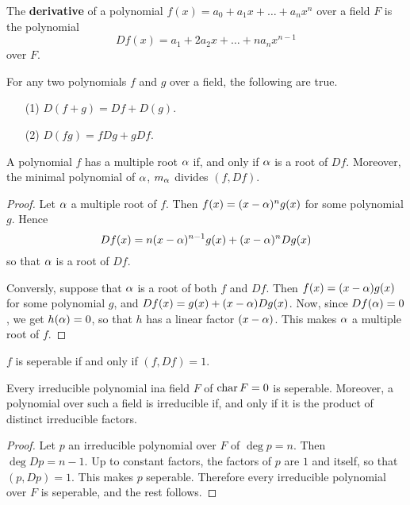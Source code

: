 \begin{definition}
  The \textbf{derivative} of a polynomial $f(x)=a_0+a_1x+\dots+a_nx^n$ over a
  field $F$ is the polynomial
  \begin{equation*}
    D{f}(x)=a_1+2a_2x+\dots+na_nx^{n-1}
  \end{equation*}
  over $F$.
\end{definition}

\begin{lemma}\label{lemma_8.6.3}
  For any two polynomials $f$ and  $g$ over a field, the following are true.
  \begin{enumerate}
    \item[(1)] $D{(f+g)}=D{f}+D{(g)}$.

    \item[(2)] $D{(fg)}=fD{g}+gD{f}$.
  \end{enumerate}
\end{lemma}

\begin{lemma}\label{lemma_8.6.4}
  A polynomial $f$ has a multiple root  $\alpha$ if, and only if  $\alpha$ is a root
  of  $D{f}$. Moreover, the minimal polynomial of $\alpha$,  $m_\alpha$ divides
  $(f,D{f})$.
\end{lemma}
\begin{proof}
  Let $\alpha$ a multiple root of  $f$. Then $f(x)=(x-\alpha)^ng(x)$ for some
  polynomial $g$. Hence
  \begin{equation*}
    D{f}(x)=n(x-\alpha)^{n-1}g(x)+(x-\alpha)^nD{g}(x)
  \end{equation*}
  so that $\alpha$ is a root of  $D{f}$.

  Conversly, suppose that $\alpha$ is a root of both  $f$ and  $D{f}$. Then
  $f(x)=(x-\alpha)g(x)$ for some polynomial $g$, and $D{f}(x)=g(x)+(x-\alpha)D{g}(x)$.
  Now, since $D{f}(\alpha)=0$, we get $h(\alpha)=0$, so that $h$ has a linear factor
  $(x-\alpha)$. This makes $\alpha$ a multiple root of $f$.
\end{proof}
\begin{corollary}
  $f$ is seperable if and only if  $(f,D{f})=1$.
\end{corollary}
\begin{corollary}
  Every irreducible polynomial ina field $F$ of  $\operatorname{char}{F}=0$ is seperable.
  Moreover, a polynomial over such a field is irreducible if, and only if it
  is the product of distinct irreducible factors.
\end{corollary}
\begin{proof}
  Let $p$ an irreducible polynomial over  $F$ of  $\deg{p}=n$. Then
  $\deg{D{p}}=n-1$. Up to constant factors, the factors of $p$ are  $1$ and
  itself, so that  $(p,D{p})=1$. This makes $p$ seperable. Therefore every
  irreducible polynomial over $F$ is seperable, and the rest follows.
\end{proof}

